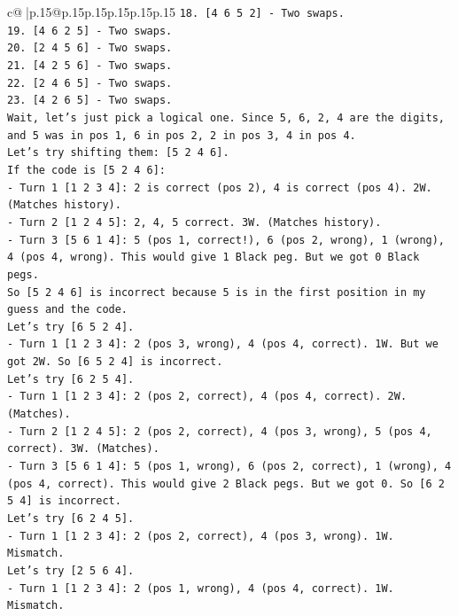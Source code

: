 \documentclass{article}
\begin{document}
{\begin{supertabular}{c@{$\;$}|p{.15\linewidth}@{}p{.15\linewidth}p{.15\linewidth}p{.15\linewidth}p{.15\linewidth}p{.15\linewidth}}
{{{\texttt{18. {[}4 6 5 2{]} {-} Two swaps.} \\
\texttt{19. {[}4 6 2 5{]} {-} Two swaps.} \\
\texttt{20. {[}2 4 5 6{]} {-} Two swaps.} \\
\texttt{21. {[}4 2 5 6{]} {-} Two swaps.} \\
\texttt{22. {[}2 4 6 5{]} {-} Two swaps.} \\
\texttt{23. {[}4 2 6 5{]} {-} Two swaps.} \\
\texttt{Wait, let's just pick a logical one. Since 5, 6, 2, 4 are the digits, and 5 was in pos 1, 6 in pos 2, 2 in pos 3, 4 in pos 4.} \\
\texttt{Let's try shifting them: {[}5 2 4 6{]}.} \\
\texttt{If the code is {[}5 2 4 6{]}:} \\
\texttt{{-} Turn 1 {[}1 2 3 4{]}: 2 is correct (pos 2), 4 is correct (pos 4). 2W. (Matches history).} \\
\texttt{{-} Turn 2 {[}1 2 4 5{]}: 2, 4, 5 correct. 3W. (Matches history).} \\
\texttt{{-} Turn 3 {[}5 6 1 4{]}: 5 (pos 1, correct!), 6 (pos 2, wrong), 1 (wrong), 4 (pos 4, wrong). This would give 1 Black peg. But we got 0 Black pegs.} \\
\texttt{So {[}5 2 4 6{]} is incorrect because 5 is in the first position in my guess and the code.} \\
\texttt{Let's try {[}6 5 2 4{]}.} \\
\texttt{{-} Turn 1 {[}1 2 3 4{]}: 2 (pos 3, wrong), 4 (pos 4, correct). 1W. But we got 2W. So {[}6 5 2 4{]} is incorrect.} \\
\texttt{Let's try {[}6 2 5 4{]}.} \\
\texttt{{-} Turn 1 {[}1 2 3 4{]}: 2 (pos 2, correct), 4 (pos 4, correct). 2W. (Matches).} \\
\texttt{{-} Turn 2 {[}1 2 4 5{]}: 2 (pos 2, correct), 4 (pos 3, wrong), 5 (pos 4, correct). 3W. (Matches).} \\
\texttt{{-} Turn 3 {[}5 6 1 4{]}: 5 (pos 1, wrong), 6 (pos 2, correct), 1 (wrong), 4 (pos 4, correct). This would give 2 Black pegs. But we got 0. So {[}6 2 5 4{]} is incorrect.} \\
\texttt{Let's try {[}6 2 4 5{]}.} \\
\texttt{{-} Turn 1 {[}1 2 3 4{]}: 2 (pos 2, correct), 4 (pos 3, wrong). 1W. Mismatch.} \\
\texttt{Let's try {[}2 5 6 4{]}.} \\
\texttt{{-} Turn 1 {[}1 2 3 4{]}: 2 (pos 1, wrong), 4 (pos 4, correct). 1W. Mismatch.} \\
}}}
\end{supertabular}}
\end{document}
